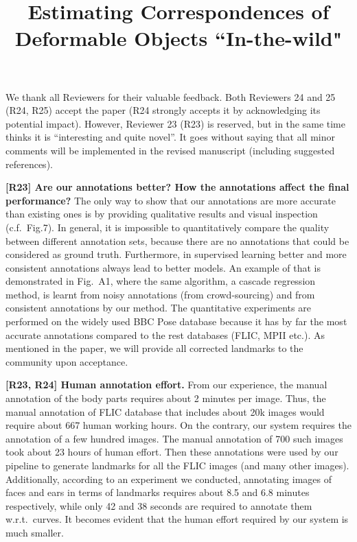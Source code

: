 \documentclass[10pt,twocolumn,letterpaper]{article}
\begin{document}
\title{Estimating Correspondences of Deformable Objects ``In-the-wild"}  %

\maketitle
\thispagestyle{empty}


We thank all Reviewers for their valuable feedback. Both Reviewers 24 and 25 (R24, R25) accept the paper (R24 strongly accepts it by acknowledging its potential impact). However, Reviewer 23 (R23) is reserved, but in the same time thinks it is ``interesting and quite novel''. It goes without saying that all minor comments will be implemented in the revised manuscript (including suggested references).  %


\textbf{[R23] Are our annotations better? How the annotations affect the final performance?}
The only way to show that our annotations are more accurate than existing ones is by providing qualitative results and visual inspection (c.f.~Fig.7). In general, it is impossible to quantitatively compare the quality between different annotation sets, because there are no annotations that could be considered as ground truth.  Furthermore, in supervised learning better and more consistent annotations always lead to better models. An example of that is demonstrated in Fig.~A1, where the same algorithm, a cascade regression method, is learnt from noisy annotations (from crowd-sourcing) and from consistent annotations by our method. The quantitative experiments are performed on the widely used BBC Pose database because it has by far the most accurate annotations compared to the rest databases (FLIC, MPII etc.). As mentioned in the paper, we will provide all  corrected landmarks to the community upon acceptance.


\textbf{[R23, R24] Human annotation effort.}
From our experience, the manual annotation of the body parts requires about 2 minutes per image. Thus, the manual annotation of FLIC database that includes about 20k images would require about 667 human working hours. On the contrary, our system requires the annotation of a few hundred images. The manual annotation of 700 such images took about 23 hours of human effort. Then these annotations were used by our pipeline to generate landmarks for all the FLIC images (and many other images). Additionally, according to an experiment we conducted, annotating images of faces and ears in terms of landmarks requires about 8.5 and 6.8 minutes respectively, while only 42 and 38 seconds are required to annotate them w.r.t.~curves. It becomes evident that the human effort required by our system is much smaller.
\end{document}

